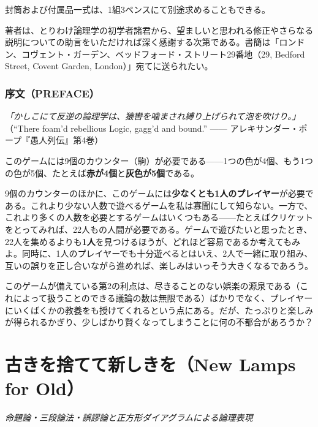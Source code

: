 \documentclass[a4paper,11pt,openany]{ltjsbook}
\begin{document}
封筒および付属品一式は、1組3ペンスにて別途求めることもできる。

著者は、とりわけ論理学の初学者諸君から、望ましいと思われる修正やさらなる説明についての助言をいただければ深く感謝する次第である。書簡は「ロンドン、コヴェント・ガーデン、ベッドフォード・ストリート29番地（29, Bedford Street, Covent Garden, London）」宛てに送られたい。

\vspace{3mm}
\subsection*{序文（PREFACE）}
\begin{center}
\textit{「かしこにて反逆の論理学は、猿轡を噛まされ縛り上げられて泡を吹けり。」}\\
\small（``There foam'd rebellious Logic, gagg'd and bound.'' —— アレキサンダー・ポープ『愚人列伝』第4巻）
\end{center}

このゲームには9個のカウンター（駒）が必要である——1つの色が4個、もう1つの色が5個、たとえば\textbf{赤が4個}と\textbf{灰色が5個}である。

9個のカウンターのほかに、このゲームには\textbf{少なくとも1人のプレイヤー}が必要である。これより少ない人数で遊べるゲームを私は寡聞にして知らない。一方で、これより多くの人数を必要とするゲームはいくつもある——たとえばクリケットをとってみれば、22人もの人間が必要である。ゲームで遊びたいと思ったとき、22人を集めるよりも\textbf{1人}を見つけるほうが、どれほど容易であるか考えてもみよ。同時に、1人のプレイヤーでも十分遊べるとはいえ、2人で一緒に取り組み、互いの誤りを正し合いながら進めれば、楽しみはいっそう大きくなるであろう。

このゲームが備えている第2の利点は、尽きることのない娯楽の源泉である（これによって扱うことのできる議論の数は無限である）ばかりでなく、プレイヤーにいくばくかの教養をも授けてくれるという点にある。だが、たっぷりと楽しみが得られるかぎり、少しばかり賢くなってしまうことに何の不都合があろうか？


\tableofcontents

\mainmatter
\chapter{古きを捨てて新しきを（New Lamps for Old）}
\label{ch:i}

\begin{center}
\large\textit{命題論・三段論法・誤謬論と正方形ダイアグラムによる論理表現}
\end{center}
\vspace{4mm}
\end{document}
